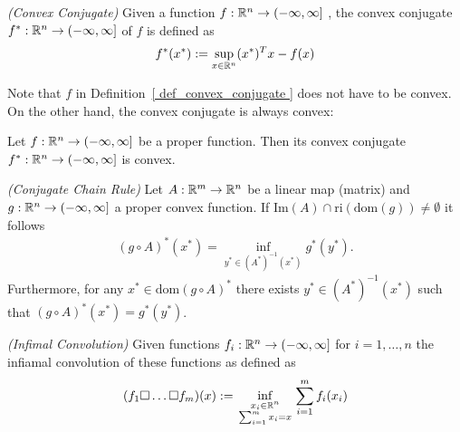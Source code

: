 \begin{definition}
  \label{ def_convex_conjugate }
  \emph{(Convex Conjugate)}
  Given a function
  $
    f:
    \mathbb{R}^n \to ( - \infty, \infty ]
  $
  ,
  the convex conjugate
  $
    f^*:
    \mathbb{R}^n \to ( - \infty, \infty ]
  $
  of $f$ is defined as
  \begin{gather}
    f^*(x^*)
    :=
    \sup_{ x \in \mathbb{R}^n }
    (x^*)^T x - f(x)
  \end{gather}
\end{definition}

Note that $f$ in Definition~\ref{ def_convex_conjugate }
does not have to be convex. On the other hand, the convex conjugate is always convex:

\begin{proposition}
  Let  
  $
    f:
    \mathbb{R}^n \to ( - \infty, \infty ]
  $
  be a proper function. 
  Then its convex conjugate
  $
    f^*:
    \mathbb{R}^n \to ( - \infty, \infty ]
  $
  is convex.
\end{proposition}


\begin{theorem}
  \emph{(Conjugate Chain Rule)}
  \label{cvxa_conjugate_chain_rule}
  Let 
  $
    A:
      \mathbb{R}^m \to \mathbb{R}^n
  $
  be a linear map (matrix)
  and
  $
    g:
      \mathbb{R}^n \to (-\infty, \infty]
  $
  a proper convex function. If
  $
    \text{Im}(A) \cap \text{ri}(\text{dom}(g))
    \neq
    \emptyset
  $
  it follows
  \begin{gather}
    ( g \circ A )^* ( x^* )
    =
    \inf_
          { y^* \in ( A^* )^{ -1 } ( x^* )}
                                          g^*( y^* )
                                          .
  \end{gather}
  Furthermore, 
    for any 
      $
        x^* \in \text{dom}( g \circ A)^*
      $
        there exists
          $
            y^* \in ( A^* )^{ -1 } ( x^* )
          $
            such that
              $
                ( g \circ A)^* ( x^* )
                =
                g^*( y^* )
              $.
\end{theorem}


\begin{definition}
  \emph{(Infimal Convolution)}
  Given functions
  $
    f_i:
    \mathbb{R}^n \to (-\infty, \infty]
  $
  for $ i = 1, \ldots, n $
  the infiamal convolution of these functions as defined as
  \begin{gather}
    (f_1 \square \ldots \square f_m)(x)
    :=
    \inf_{
    \begin{smallmatrix}
      x_i \in \mathbb{R}^n \\
      \sum_{i = 1}^{m} 
        x_i
      =
      x
    \end{smallmatrix}
    }
    \sum_{i = 1}^{m}
      f_i(x_i)
  \end{gather}
\end{definition}


